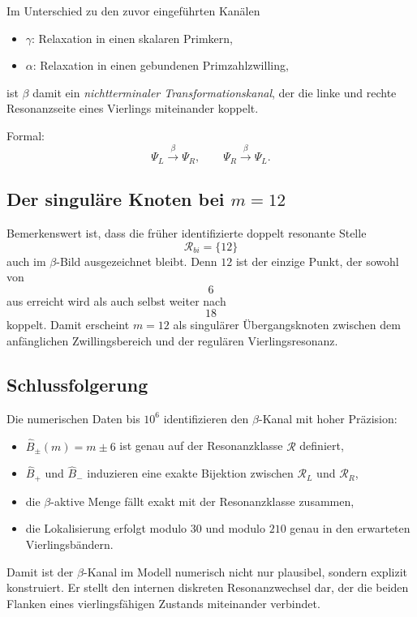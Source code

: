 \documentclass[11pt,a4paper]{article}
\theoremstyle{definition}
\theoremstyle{plain}
\theoremstyle{remark}
\begin{document}
	Im Unterschied zu den zuvor eingeführten Kanälen
	
	\begin{itemize}
		\item \(\gamma\): Relaxation in einen skalaren Primkern,
		\item \(\alpha\): Relaxation in einen gebundenen Primzahlzwilling,
	\end{itemize}
	
	ist \(\beta\) damit ein \emph{nichtterminaler Transformationskanal}, der die linke und rechte Resonanzseite eines Vierlings miteinander koppelt.
	
	Formal:
	\[
	\Psi_L \xrightarrow{\beta} \Psi_R,
	\qquad
	\Psi_R \xrightarrow{\beta} \Psi_L.
	\]
	
	\subsection{Der singuläre Knoten bei \texorpdfstring{$m=12$}{m=12}}
	
	Bemerkenswert ist, dass die früher identifizierte doppelt resonante Stelle
	\[
	\mathcal R_{bi}=\{12\}
	\]
	auch im \(\beta\)-Bild ausgezeichnet bleibt. 
	Denn \(12\) ist der einzige Punkt, der sowohl von
	\[
	6
	\]
	aus erreicht wird als auch selbst weiter nach
	\[
	18
	\]
	koppelt. 
	Damit erscheint \(m=12\) als singulärer Übergangsknoten zwischen dem anfänglichen Zwillingsbereich und der regulären Vierlingsresonanz.
	
	\subsection{Schlussfolgerung}
	
	Die numerischen Daten bis \(10^6\) identifizieren den \(\beta\)-Kanal mit hoher Präzision:
	
	\begin{itemize}
		\item \(\hat B_\pm(m)=m\pm 6\) ist genau auf der Resonanzklasse \(\mathcal R\) definiert,
		\item \(\hat B_+\) und \(\hat B_-\) induzieren eine exakte Bijektion zwischen \(\mathcal R_L\) und \(\mathcal R_R\),
		\item die \(\beta\)-aktive Menge fällt exakt mit der Resonanzklasse zusammen,
		\item die Lokalisierung erfolgt modulo \(30\) und modulo \(210\) genau in den erwarteten Vierlingsbändern.
	\end{itemize}
	
	Damit ist der \(\beta\)-Kanal im Modell numerisch nicht nur plausibel, sondern explizit konstruiert.
	Er stellt den internen diskreten Resonanzwechsel dar, der die beiden Flanken eines vierlingsfähigen Zustands miteinander verbindet.
	
\end{document}
